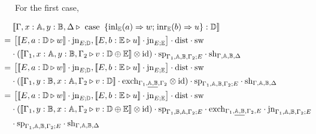 For the first case,

\begin{equation*}
  \hspace{-20pt}
  \begin{split}
    & \hspace{2pt} [\![\Gamma,x:\mathbb{A}, y:\mathbb{B}, \Delta \triangleright \text{ case }  \hspace{2pt}  \{\text{inl}_{\mathbb{E}} (a) \Rightarrow w ; \hspace{1pt} \text{inr}_{\mathbb{E}} (b) \Rightarrow u\}: \mathbb{D}]\!] \\
 = & \hspace{2pt}  \left[ [\![ E, a:\mathbb{D} \triangleright w ]\!] \cdot \text{jn}_{E;\mathbb{D}},[\![ E, b:\mathbb{E} \triangleright u]\!]\cdot \text{jn}_{E;\mathbb{E} }\right] \cdot \text{dist} \cdot \text{sw}  \\
  & \cdot ([\![\Gamma_{1},x:\mathbb{A}, y:\mathbb{B},\Gamma_{2} \triangleright v : \mathbb{D} \oplus \mathbb{E}  ]\!] \otimes \text{id})  \cdot \text{sp}_{\Gamma_{1},\mathbb{A}, \mathbb{B},\Gamma_{2};E} \cdot \text{sh}_{\Gamma,\mathbb{A}, \mathbb{B},\Delta} \\
 = &  \hspace{2pt}  \left[ [\![ E, a:\mathbb{D} \triangleright w ]\!] \cdot \text{jn}_{E;\mathbb{D}},[\![ E, b:\mathbb{E} \triangleright u]\!]\cdot \text{jn}_{E;\mathbb{E} }\right] \cdot \text{dist} \cdot \text{sw}  \\
 & \cdot ([\![\Gamma_{1}, y:\mathbb{B},x:\mathbb{A},\Gamma_{2} \triangleright v: \mathbb{D}]\! ] \cdot \text{exch}_{\Gamma_{1}, \underline{\mathbb{A},\mathbb{B}},\Gamma_{2}} \otimes \text{id}) \cdot \text{sp}_{\Gamma_{1},\mathbb{A}, \mathbb{B},\Gamma_{2};E} \cdot \text{sh}_{\Gamma,\mathbb{A}, \mathbb{B},\Delta} \\
 = & \hspace{2pt}   \left[ [\![ E, a:\mathbb{D} \triangleright w ]\!] \cdot \text{jn}_{E;\mathbb{D}},[\![ E, b:\mathbb{E} \triangleright u]\!]\cdot \text{jn}_{E;\mathbb{E} }\right] \cdot \text{dist} \cdot \text{sw}  \\
 &\cdot ([\![\Gamma_{1}, y:\mathbb{B},x:\mathbb{A},\Gamma_{2}  \triangleright v : \mathbb{D} \oplus \mathbb{E}  ]\!] \otimes \text{id})\cdot \text{sp}_{\Gamma_{1}, \mathbb{B},\mathbb{A},\Gamma_{2};E} \cdot \text{exch}_{\Gamma_{1},\underline{\mathbb{A},\mathbb{B}},\Gamma_{2},E} \cdot \text{jn}_{\Gamma_{1},\mathbb{A}, \mathbb{B},\Gamma_{2};E}  \\
 &\cdot \text{sp}_{\Gamma_{1},\mathbb{A}, \mathbb{B},\Gamma_{2};E} \cdot \text{sh}_{\Gamma,\mathbb{A}, \mathbb{B},\Delta} \\

\end{split}
\end{equation*}
